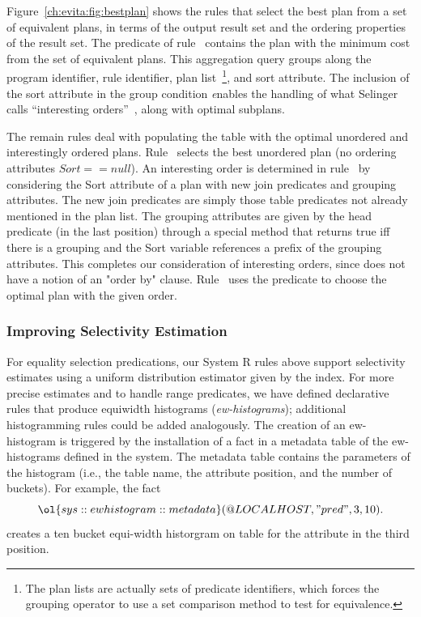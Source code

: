 Figure~\ref{ch:evita:fig:bestplan} shows the rules that select the best plan
from a set of equivalent plans, in terms of the output result set and the
ordering properties of the result set.  The  predicate of
rule~ contains the plan with the minimum cost from the set of
equivalent plans.  This aggregation query groups along the program identifier,
rule identifier, plan list~\footnote{The plan lists are actually sets of
predicate identifiers, which forces the grouping operator to use a set
comparison method to test for equivalence.}, and sort attribute.  The inclusion
of the sort attribute in the group condition {\emph enables} the handling of
what Selinger calls ``interesting orders''~\cite{selinger}, along with optimal
subplans.

The remain rules deal with populating the  table with the optimal
unordered and interestingly ordered plans.  Rule~ selects the best
unordered plan (no ordering attributes $Sort == null$).  An interesting order
is determined in rule~ by considering the Sort attribute of a plan with
new join predicates and grouping attributes.  The new join predicates are
simply those table predicates not already mentioned in the plan list.  The
grouping attributes are given by the head predicate (in the last position)
through a special method that returns true iff there is a grouping and the Sort
variable references a prefix of the grouping attributes.  This completes our
consideration of interesting orders, since \OVERLOG does not have a notion of
an "order by" clause.  Rule~ uses the  predicate
to choose the optimal plan with the given order.
 
\subsubsection{Improving Selectivity Estimation}

For equality selection predications, our System R rules above support selectivity
estimates using a uniform distribution estimator given by the index. For more precise
estimates and to handle range predicates, we have defined declarative rules that produce
equiwidth histograms ({\em ew-histograms}); additional histogramming rules could be
added analogously. The creation of an ew-histogram is triggered by the installation of a
fact in a metadata table of the ew-histograms defined in the system. The metadata table 
contains the parameters of the histogram (i.e., the table name, the attribute position,
and the number of buckets). For example, the fact
\[
\ol{sys::ewhistogram::metadata}(@LOCALHOST, "pred", 3, 10).
\]
creates a ten bucket equi-width historgram on table  for the attribute in the
third position.

